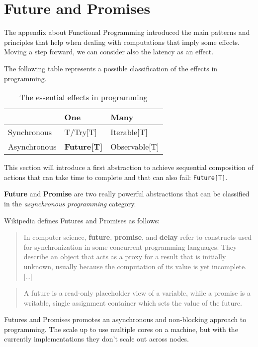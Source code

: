 \chapter{Future and Promises}\label{future-and-promises}

The appendix about Functional Programming introduced the main patterns
and principles that help when dealing with computations that imply some
effects. Moving a step forward, we can consider also the latency as an
effect.

The following table represents a possible classification of the effects
in programming.

\begin{table}[]
\centering
\caption{The essential effects in programming}
\label{my-label}
\begin{tabular}{|l|l|l|}
\hline
             & {\bf One}     & {\bf Many}        \\ \hline
Synchronous  & T/Try{[}T{]}  & Iterable{[}T{]}   \\ \hline
Asynchronous &  \textbf{Future{[}T{]}} &Observable{[}T{]} \\ \hline
\end{tabular}
\end{table}

This section will introduce a first abstraction to achieve sequential
composition of actions that can take time to complete and that can also
fail: \texttt{Future{[}T{]}}.

\textbf{Future} and \textbf{Promise} are two really powerful
abstractions that can be classified in the \emph{asynchronous
programming} category.

Wikipedia defines Futures and Promises as follows:

\begin{quote}
In computer science, \textbf{future}, \textbf{promise}, and
\textbf{delay} refer to constructs used for synchronization in some
concurrent programming languages. They describe an object that acts as a
proxy for a result that is initially unknown, usually because the
computation of its value is yet incomplete. {[}\ldots{}{]}
\end{quote}

\begin{quote}
A future is a read-only placeholder view of a variable, while a promise
is a writable, single assignment container which sets the value of the
future.
\end{quote}

Futures and Promises promotes an asynchronous and non-blocking approach
to programming. The scale up to use multiple cores on a machine, but
with the currently implementations they don't scale out across nodes.

